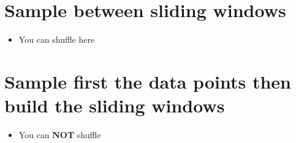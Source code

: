 \section{Sample between sliding windows}
        \begin{itemize}
            \item You can shuffle here
        \end{itemize}
\section{Sample first the data points then build the sliding windows}
    \begin{itemize}
        \item You can \textbf{NOT} shuffle
    \end{itemize}